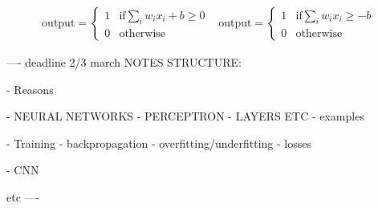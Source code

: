 \documentclass{article}
\begin{document}
$$
\begin{aligned}
    \text{output}=\begin{cases}
        1 & \text{if}\displaystyle\sum_{i} w_ix_i+b\geq 0 \\ 
        0 & \text{otherwise}
    \end{cases}
    & 
    \text{output}=\begin{cases}
        1 & \text{if}\displaystyle\sum_{i} w_ix_i\geq -b \\ 
        0 & \text{otherwise}
    \end{cases}
\end{aligned}
$$

---- deadline 2/3 march
NOTES STRUCTURE:

- Reasons

- NEURAL NETWORKS 
   - PERCEPTRON
   - LAYERS ETC
   - examples

- Training
   - backpropagation
   - overfitting/underfitting
   - losses

- CNN

etc
----
\end{document}
